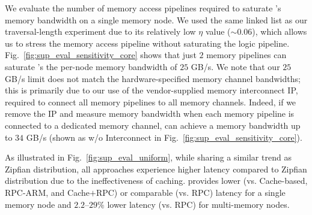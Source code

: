  We evaluate the number of \pulse memory access pipelines required to saturate \pulse's memory bandwidth on a single memory node. We used the same linked list as our traversal-length experiment due to its relatively low $\eta$ value ($\sim$$0.06$), which allows us to stress the memory access pipeline without saturating the logic pipeline. Fig.~\ref{fig:sup_eval_sensitivity_core} shows that just $2$ memory pipelines can saturate \pulse's the per-node memory bandwidth of $25$ GB/s. We note that our $25$ GB/s limit does not match the hardware-specified memory channel bandwidths; this is primarily due to our use of the vendor-supplied memory interconnect IP, required to connect all memory pipelines to all memory channels. Indeed, if we remove the IP and measure memory bandwidth when each memory pipeline is connected to a dedicated memory channel, \pulse can achieve a memory bandwidth up to $34$ GB/s (shown as \pulse w/o Interconnect in Fig.~\ref{fig:sup_eval_sensitivity_core}). 

 As illustrated in Fig.~\ref{fig:sup_eval_uniform}, while sharing a similar trend as Zipfian distribution, all approaches experience higher latency compared to Zipfian distribution due to the ineffectiveness of caching. \pulse provides lower (vs. Cache-based, RPC-ARM, and Cache$+$RPC) or comparable (vs. RPC) latency for a single memory node and $2.2$--$29\%$ lower latency (vs. RPC) for multi-memory nodes. 



